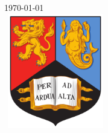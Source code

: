 \documentclass[11pt]{article}
\begin{document}
\begin{titlepage}

\vspace{1cm}

{\large \today}\\[0.75cm] %

\includegraphics[width=4.5cm, height=5cm]{logo}
 

\vfill %

\end{titlepage}
\end{document}
